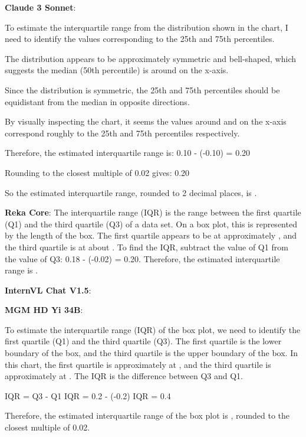 \begin{wronganswer}
\textbf{Claude 3 Sonnet}: \small{To estimate the interquartile range from the distribution shown in the chart, I need to identify the values corresponding to the 25th and 75th percentiles.

The distribution appears to be approximately symmetric and bell-shaped, which suggests the median (50th percentile) is around  on the x-axis.

Since the distribution is symmetric, the 25th and 75th percentiles should be equidistant from the median in opposite directions.

By visually inspecting the chart, it seems the values around  and  on the x-axis correspond roughly to the 25th and 75th percentiles respectively.

Therefore, the estimated interquartile range is:
0.10 - (-0.10) = 0.20

Rounding to the closest multiple of 0.02 gives: 0.20

So the estimated interquartile range, rounded to 2 decimal places, is .}
\end{wronganswer}

\begin{wronganswer}
\textbf{Reka Core}: \small{ The interquartile range (IQR) is the range between the first quartile (Q1) and the third quartile (Q3) of a data set. On a box plot, this is represented by the length of the box. The first quartile appears to be at approximately , and the third quartile is at about . To find the IQR, subtract the value of Q1 from the value of Q3: 0.18 - (-0.02) = 0.20. Therefore, the estimated interquartile range is .}
\end{wronganswer}

\begin{wronganswer}
\textbf{InternVL Chat V1.5}: \small{}
\end{wronganswer}

\begin{wronganswer}
\textbf{MGM HD Yi 34B}: \small{To estimate the interquartile range (IQR) of the box plot, we need to identify the first quartile (Q1) and the third quartile (Q3). The first quartile is the lower boundary of the box, and the third quartile is the upper boundary of the box. In this chart, the first quartile is approximately at , and the third quartile is approximately at . The IQR is the difference between Q3 and Q1.

IQR = Q3 - Q1
IQR = 0.2 - (-0.2)
IQR = 0.4

Therefore, the estimated interquartile range of the box plot is , rounded to the closest multiple of 0.02.}
\end{wronganswer}

